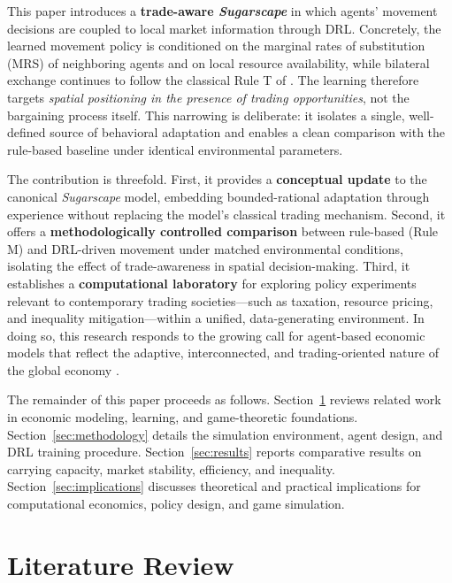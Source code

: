 \documentclass[pdflatex,sn-mathphys-num]{sn-jnl}%
\theoremstyle{thmstyleone}%
\theoremstyle{thmstyletwo}%
\theoremstyle{thmstylethree}%
\begin{document}
This paper introduces a \textbf{trade-aware \textit{Sugarscape}} in which agents' movement decisions are coupled to local market information through DRL.  
Concretely, the learned movement policy is conditioned on the marginal rates of substitution (MRS) of neighboring agents and on local resource availability, while bilateral exchange continues to follow the classical Rule T of \citet{EpsteinAxtell1996}.  
The learning therefore targets \emph{spatial positioning in the presence of trading opportunities}, not the bargaining process itself.  
This narrowing is deliberate: it isolates a single, well-defined source of behavioral adaptation and enables a clean comparison with the rule-based baseline under identical environmental parameters.

The contribution is threefold.  
First, it provides a \textbf{conceptual update} to the canonical \textit{Sugarscape} model, embedding bounded-rational adaptation through experience \citep{Simon1957} without replacing the model's classical trading mechanism.  
Second, it offers a \textbf{methodologically controlled comparison} between rule-based (Rule M) and DRL-driven movement under matched environmental conditions, isolating the effect of trade-awareness in spatial decision-making.  
Third, it establishes a \textbf{computational laboratory} for exploring policy experiments relevant to contemporary trading societies---such as taxation, resource pricing, and inequality mitigation---within a unified, data-generating environment.  
In doing so, this research responds to the growing call for agent-based economic models that reflect the adaptive, interconnected, and trading-oriented nature of the global economy \citep{Tesfatsion2017}.

The remainder of this paper proceeds as follows.  
Section~\ref{sec:literature} reviews related work in economic modeling, learning, and game-theoretic foundations.  
Section~\ref{sec:methodology} details the simulation environment, agent design, and DRL training procedure.  
Section~\ref{sec:results} reports comparative results on carrying capacity, market stability, efficiency, and inequality.  
Section~\ref{sec:implications} discusses theoretical and practical implications for computational economics, policy design, and game simulation.


\section{Literature Review}
\label{sec:literature}
\end{document}
